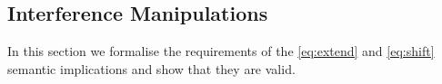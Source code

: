 %	
%


\vspace{-.5ex}
\subsection{Interference Manipulations}\label{subsec:extension}
\vspace{-.5ex}


In this section we formalise the requirements of the \eqref{eq:extend}
and \eqref{eq:shift} semantic implications and show that they are
valid.


